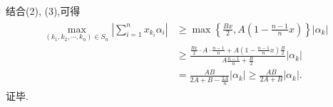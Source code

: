 \begin{solution}
	结合(2), (3),可得
	\begin{align*}
		\begin{aligned}
			\max _{\left(k_1, k_2, \cdots, k_n\right) \in S_n}\left|\sum_{i=1}^n x_{k_i} \alpha_i\right| & \geqslant \max \left\{\frac{B x}{2}, A\left(1-\frac{n-1}{n} x\right)\right\}\left|\alpha_k\right|                                                        \\
			                                                                                             & \geqslant \frac{\frac{B x}{2} \cdot A \cdot \frac{n-1}{n}+A\left(1-\frac{n-1}{n} x\right) \frac{B}{2}}{A \frac{n-1}{n}+\frac{B}{2}}\left|\alpha_k\right| \\
			                                                                                             & =\frac{A B}{2 A+B-\frac{2 A}{n}}\left|\alpha_k\right| \geqslant \frac{A B}{2 A+B}\left|\alpha_k\right| .
		\end{aligned}
	\end{align*}
	证毕.
\end{solution}

